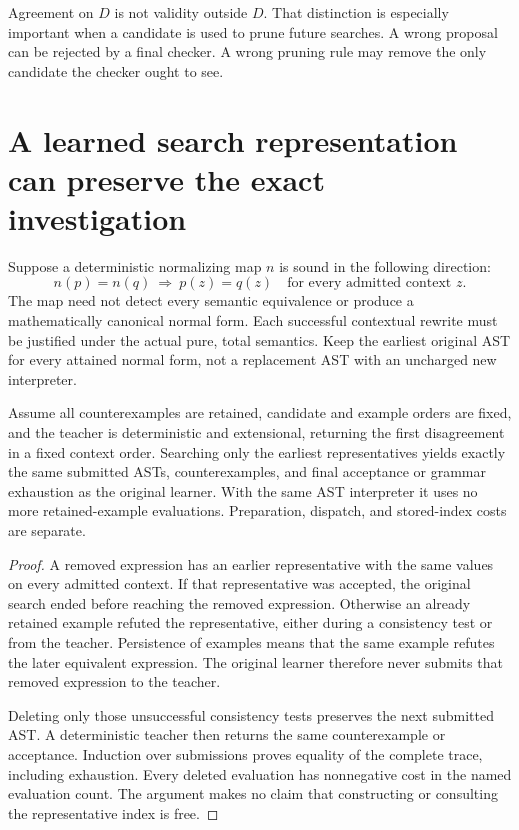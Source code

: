 Agreement on $D$ is not validity outside $D$. That distinction is especially important when a candidate is used to prune future searches. A wrong proposal can be rejected by a final checker. A wrong pruning rule may remove the only candidate the checker ought to see.

\section{A learned search representation can preserve the exact investigation}
Suppose a deterministic normalizing map $n$ is sound in the following direction:
\[
n(p)=n(q)\ \Longrightarrow\ p(z)=q(z)\quad\text{for every admitted context }z.
\]
The map need not detect every semantic equivalence or produce a mathematically canonical normal form. Each successful contextual rewrite must be justified under the actual pure, total semantics. Keep the earliest original AST for every attained normal form, not a replacement AST with an uncharged new interpreter.

\begin{theorem}\label{r:ordered}
Assume all counterexamples are retained, candidate and example orders are fixed, and the teacher is deterministic and extensional, returning the first disagreement in a fixed context order. Searching only the earliest representatives yields exactly the same submitted ASTs, counterexamples, and final acceptance or grammar exhaustion as the original learner. With the same AST interpreter it uses no more retained-example evaluations. Preparation, dispatch, and stored-index costs are separate.
\end{theorem}
\begin{proof}
A removed expression has an earlier representative with the same values on every admitted context. If that representative was accepted, the original search ended before reaching the removed expression. Otherwise an already retained example refuted the representative, either during a consistency test or from the teacher. Persistence of examples means that the same example refutes the later equivalent expression. The original learner therefore never submits that removed expression to the teacher.

Deleting only those unsuccessful consistency tests preserves the next submitted AST. A deterministic teacher then returns the same counterexample or acceptance. Induction over submissions proves equality of the complete trace, including exhaustion. Every deleted evaluation has nonnegative cost in the named evaluation count. The argument makes no claim that constructing or consulting the representative index is free.
\end{proof}

